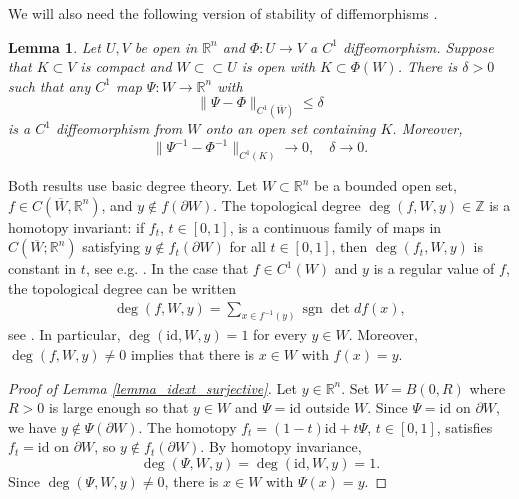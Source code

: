 \documentclass[11pt,letterpaper]{amsart}
\newtheorem{Lemma}[Theorem]{Lemma}
\theoremstyle{definition}
\numberwithin{equation}{section}
\newcommand{\mR}{\mathbb{R}}                    %
\newcommand{\norm}[1]{\lVert #1 \rVert}         %
\newcommand{\ol}[1]{\overline{#1}}
\newcommand{\id}{\mathrm{id}}
\newcommand{\p}{\partial}
\def\p{\partial}
\def\R{\mathbb R}
\begin{document}
We will also need the following version of stability of diffemorphisms \cite[\S1.6]{guillemin1974}.

\begin{Lemma} \label{lemma_diffeo_perturbation}
Let $U, V$ be open in $\mR^n$ and $\Phi: U \to V$ a $C^1$ diffeomorphism. Suppose that $K \subset V$ is compact and $W \subset \subset U$ is open with $K \subset \Phi(W)$. There is $\delta > 0$ such that any $C^1$ map $\Psi: W \to \mR^n$ with 
\begin{equation} \label{phi_delta_stability}
\norm{\Psi - \Phi}_{C^1(\ol{W})} \leq \delta
\end{equation}
is a $C^1$ diffeomorphism from $W$ onto an open set containing $K$. Moreover, 
\[
\|\Psi^{-1} - \Phi^{-1}\|_{C^1(K)} \to 0, \quad \delta \to 0.
\]
\end{Lemma}

Both results use basic degree theory. Let $W \subset \R^n$ be a bounded open set, $f \in C(\overline{W}, \R^n)$, and $y \notin f(\partial W)$. The topological degree $\deg(f, W, y) \in \mathbb Z$ is a homotopy invariant: if $f_t$, $t \in [0,1]$, is a continuous family of maps in $C(\overline{W};\R^n)$ satisfying
$y \notin f_t(\partial W)$ for all $t \in [0,1]$, then
$\deg(f_t, W, y)$ is constant in $t$, see e.g. \cite[Theorem~3.1]{deimling1985}. In the case that $f \in C^1(W)$ and $y$ is a regular value of $f$, the topological degree can be written 
    \begin{align*}%
\deg(f, W, y) = \sum_{x \in f^{-1}(y)} \operatorname{sgn}
\det df(x),
    \end{align*}
see \cite[Definition~2.1]{deimling1985}. In particular, $\deg(\id, W, y) = 1$ for every $y \in W$. Moreover, $\deg(f, W, y) \neq 0$ implies that 
there is $x \in W$ with $f(x) = y$.

\begin{proof}[Proof of Lemma \ref{lemma_idext_surjective}]
Let $y \in \mathbb{R}^n$. Set $W = B(0, R)$ where $R > 0$ is large enough so that $y \in W$ and $\Psi = \id$ outside $W$.
Since $\Psi = \id$ on $\p W$, we have $y \notin \Psi(\partial W)$.
The homotopy $f_t = (1-t)\id + t\Psi$, $t \in [0,1]$,
satisfies $f_t = \id$ on $\partial W$,
so $y \notin f_t(\partial W)$. By homotopy invariance,
\[
\deg(\Psi, W, y)
= \deg(\mathrm{id}, W, y)
= 1.
\]
Since $\deg(\Psi, W, y) \ne 0$, there is $x \in W$ with $\Psi(x) = y$.
\end{proof}
\end{document}
